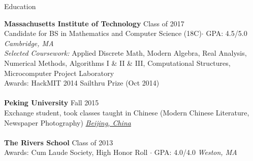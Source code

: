 \documentclass{resume} %
\begin{document}

\begin{rSection}{Education}

{\bf Massachusetts Institute of Technology} \hfill Class of 2017
\\ Candidate for BS in Mathematics and Computer Science (18C)$\cdot$ GPA: 4.5/5.0 \hfill {\em Cambridge, MA}
\\ {\em Selected Coursework:} 
Applied Discrete Math, Modern Algebra, Real Analysis, Numerical Methods,
Algorithms I \& II \& III, Computational Structures, Microcomputer Project Laboratory
\\ Awards: HackMIT 2014 Sailthru Prize (Oct 2014)
\\
\\ {\bf Peking University} \hfill Fall 2015
\\ Exchange student, took classes taught in Chinese (Modern Chinese Literature, Newspaper Photography)  \hfill \underline{\em Beijing, China}
\\
\\ {\bf The Rivers School} \hfill  Class of 2013
\\ Awards: Cum Laude Society, High Honor Roll $\cdot$ GPA: 4.0/4.0 \hfill {\em Weston, MA}

\end{rSection}

\end{document}
